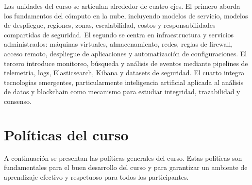 \documentclass[
  coursetitle={Cómputo Nube y Tecnologías Emergentes},
  coursehours={96},
  coursedate={Verano 2026},
  doctype={Guía del curso},
  otherlangs={english,french},
  authorname={Lázaro},
  authorsurname={Bustio-Martínez},
  authortitle={PhD},
  role={Profesor Investigador},
  email={lbustio@inaoe.mx},
  phone={5559504000},
  ext={7459},
  institution={Instituto Nacional de Astrofísica, Óptica y Electrónica (INAOE)},
  department={Maestría en Ciencias en Tecnologías de Seguridad},
  address={Luis Enrique Erro 1, Sta. Ma. Tonantzintla, San Andrés Cholula, CP 72840, Puebla, México},
  margin={0.5in}
]{../../lbustio_lecture_notes}
\begin{document}
Las unidades del curso se articulan alrededor de cuatro ejes. El primero aborda los fundamentos del cómputo en la nube, incluyendo modelos de servicio, modelos de despliegue, regiones, zonas, escalabilidad, costos y responsabilidades compartidas de seguridad. El segundo se centra en infraestructura y servicios administrados: máquinas virtuales, almacenamiento, redes, reglas de firewall, acceso remoto, despliegue de aplicaciones y automatización de configuraciones. El tercero introduce monitoreo, búsqueda y análisis de eventos mediante pipelines de telemetría, logs, Elasticsearch, Kibana y datasets de seguridad. El cuarto integra tecnologías emergentes, particularmente inteligencia artificial aplicada al análisis de datos y blockchain como mecanismo para estudiar integridad, trazabilidad y consenso.

\section{Políticas del curso}
\label{sec:politicas}

A continuación se presentan las políticas generales del curso. Estas políticas son fundamentales para el buen desarrollo del curso y para garantizar un ambiente de aprendizaje efectivo y respetuoso para todos los participantes.
\end{document}
